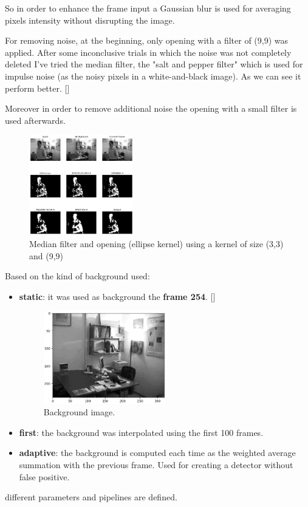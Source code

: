 \documentclass{article}
\newcommand{\CREF}[1]{[\hyperref[#1]{\Cref{#1}}]}
\begin{document}
So in order to enhance the frame input a Gaussian blur is used for averaging pixels intensity without disrupting the image.

For removing noise, at the beginning, only opening with a filter of (9,9) was applied.
After some inconclusive trials in which the noise was not completely deleted I've tried the median filter, the "salt and pepper filter" which is used for impulse noise (as the noisy pixels in a white-and-black image).
As we can see it perform better. \CREF{medfilter}

Moreover in order to remove additional noise the opening with a small filter is used afterwards.
\begin{figure}
    \centering
    \includegraphics[width=0.4\textwidth,keepaspectratio]{median filter.png}
    \caption{Median filter and opening (ellipse kernel) using a kernel of size (3,3) and (9,9) }
    \label{medfilter}
\end{figure}


Based on the kind of background used:
    \begin{itemize}
        \item \textbf{static}: it was used as background the \textbf{frame 254}. \CREF{bg}
              \begin{figure}[ht]
                  \centering
                  \includegraphics[width=0.5\textwidth,keepaspectratio]{bg.png}
                  \caption{Background image.\label{bg}}
              \end{figure}
        \item \textbf{first}: the background was interpolated using the first 100 frames.
        \item \textbf{adaptive}: the background is computed each time as the weighted average summation with the previous frame. Used for creating a detector without false positive.
    \end{itemize}  
different parameters and pipelines are defined.
\end{document}
